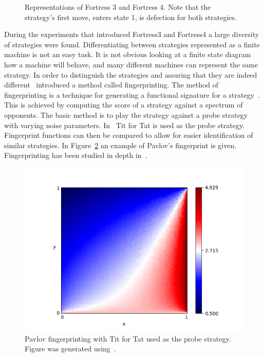 \documentclass{article}
\theoremstyle{definition}
\begin{document}
\begin{figure}[!hbtp]
\centering
    \begin{subfigure}{.4\textwidth}
        
    \end{subfigure}
    \begin{subfigure}{.4\textwidth}\centering
        
     \end{subfigure}
     \caption{Representations of Fortress 3 and Fortress 4. Note that the
     strategy's first move, enters state 1, is defection for both strategies.}
     \label{fig:fortress3_and_4}
\end{figure}

During the experiments that introduced Fortress3 and Fortress4 a large diversity
of strategies were found. Differentiating between strategies represented as 
a finite machine is not an easy task.  It is not obvious looking at a finite
state diagram how a machine will behave, and many different machines can represent
the same strategy.
In order to distinguish
the strategies and assuring that they are indeed different~\cite{Ashlock2005}
introduced a method called fingerprinting.
The method of fingerprinting is a technique for generating a functional signature for a
strategy~\cite{Ashlock2008}. This is achieved by computing the score of a strategy
against a spectrum of opponents. The basic method is to play the strategy
against a probe strategy with varying noise parameters. In~\cite{Ashlock2005}
Tit for Tat is used as the probe strategy. Fingerprint functions
can then be compared to allow for easier identification of similar strategies.
In Figure~\ref{fig:fingerprinting} an example of Pavlov's fingerprint is given.
Fingerprinting has been studied in depth in~\cite{Ashlock2008, Ashlock2009,
Ashlock2010, Ashlock2006a}.

\begin{figure}[!hbtp]
    \centering
    \includegraphics[height=.3\textheight]{./assets/images/Win-Stay_Lose-Shift.png}
    \caption{Pavlov fingerprinting with Tit for Tat used as the probe strategy.
    Figure was generated using~\cite{axelrodproject}.}
    \label{fig:fingerprinting}
\end{figure}
\end{document}
